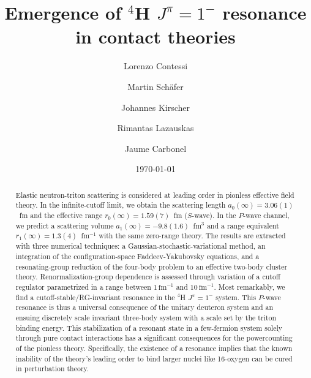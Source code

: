 \documentclass[5p,times]{elsarticle}
\begin{document}
\title{Emergence of $^4$H $J^\pi=1^-$ resonance in contact theories}

\author{Lorenzo Contessi}%
\address{Universit\'e Paris-Saclay, CNRS-IN2P3, IJCLab, 91405 Orsay, France}
\address{IRFU, CEA, Universit\'e Paris-Saclay, 91191 Gif-sur-Yvette, France}

\author{Martin Sch{\"a}fer}
\address{The Racah Institute of Physics, The Hebrew University, Jerusalem 9190401, Israel}

\author{Johannes Kirscher}
\address{Department of Physics, SRM University - AP, Amaravati 522502, Andhra Pradesh, India}
\address{Theoretical Physics Division, School of Physics and Astronomy,\\
  The University of Manchester, Manchester, M13 9PL, UK}


\author{Rimantas Lazauskas}
\address{IPHC, IN2P3-CNRS/Universit\'e de Strasbourg BP 28, F-67037 Strasbourg Cedex 2, France}

\author{Jaume Carbonel}
\address{Universit\'e Paris-Saclay, CNRS/IN2P3, IJCLab, 91405 Orsay, France}




\date{\today}



\begin{abstract}

Elastic neutron-triton scattering is considered at leading order in pionless effective field theory.
In the infinite-cutoff limit, we obtain the scattering length $a_0(\infty) = 3.06(1)$~fm
and the effective range $r_0(\infty) = 1.59(7)$~fm ($S$-wave). 
In the $P$-wave channel, we predict a scattering volume $a_1(\infty) = -9.8(1.6)$~fm$^3$
and a range equivalent $r_1(\infty) = 1.3(4)$~fm$^{-1}$ with the same zero-range theory. 
%
The results are extracted with three numerical techniques: a
Gaussian-stochastic-variational method, an integration of the configuration-space Faddeev-Yakubovsky 
equations, and a resonating-group reduction of the four-body problem to an effective two-body cluster theory. 
Renormalization-group dependence is assessed through variation of a cutoff regulator parametrized in a
range between $1\,\text{fm}^{-1}$ and $10\,\text{fm}^{-1}$.
%
Most remarkably, we find a cutoff-stable/RG-invariant resonance in the $^4$H $J^\pi=1^-$ system.
This $P$-wave resonance is thus a universal consequence of the unitary deuteron system
and an ensuing discretely scale invariant three-body system with a scale set by the triton binding energy.
%
This stabilization of a resonant state in a few-fermion system solely through pure contact interactions
has a significant consequences for the powercounting of the pionless theory.
Specifically, the existence of a resonance implies that the known inability of the theory's leading order
to bind larger nuclei like 16-oxygen can be cured in perturbation theory.

\end{abstract}
\end{document}
